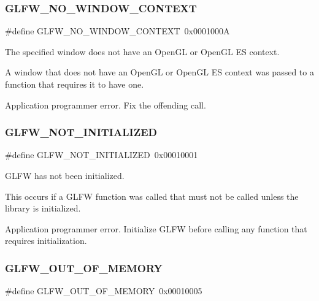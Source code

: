 \subsubsection{\texorpdfstring{G\+L\+F\+W\+\_\+\+N\+O\+\_\+\+W\+I\+N\+D\+O\+W\+\_\+\+C\+O\+N\+T\+E\+XT}{GLFW\_NO\_WINDOW\_CONTEXT}}
{\footnotesize\ttfamily \#define G\+L\+F\+W\+\_\+\+N\+O\+\_\+\+W\+I\+N\+D\+O\+W\+\_\+\+C\+O\+N\+T\+E\+XT~0x0001000A}



The specified window does not have an Open\+GL or Open\+GL ES context. 

A window that does not have an Open\+GL or Open\+GL ES context was passed to a function that requires it to have one.

Application programmer error. Fix the offending call. \mbox{\label{group__errors_ga2374ee02c177f12e1fa76ff3ed15e14a}} 
\subsubsection{\texorpdfstring{G\+L\+F\+W\+\_\+\+N\+O\+T\+\_\+\+I\+N\+I\+T\+I\+A\+L\+I\+Z\+ED}{GLFW\_NOT\_INITIALIZED}}
{\footnotesize\ttfamily \#define G\+L\+F\+W\+\_\+\+N\+O\+T\+\_\+\+I\+N\+I\+T\+I\+A\+L\+I\+Z\+ED~0x00010001}



G\+L\+FW has not been initialized. 

This occurs if a G\+L\+FW function was called that must not be called unless the library is initialized.

Application programmer error. Initialize G\+L\+FW before calling any function that requires initialization. \mbox{\label{group__errors_ga9023953a2bcb98c2906afd071d21ee7f}} 
\subsubsection{\texorpdfstring{G\+L\+F\+W\+\_\+\+O\+U\+T\+\_\+\+O\+F\+\_\+\+M\+E\+M\+O\+RY}{GLFW\_OUT\_OF\_MEMORY}}
{\footnotesize\ttfamily \#define G\+L\+F\+W\+\_\+\+O\+U\+T\+\_\+\+O\+F\+\_\+\+M\+E\+M\+O\+RY~0x00010005}



